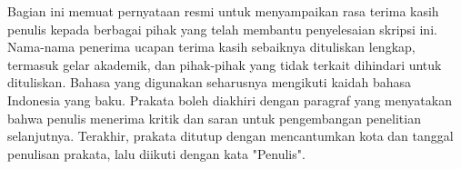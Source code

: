 \newpage
{}
\vspace{10mm}
\normalsize
\justifying

Bagian ini memuat pernyataan resmi untuk menyampaikan rasa terima kasih penulis kepada berbagai pihak yang telah membantu penyelesaian skripsi ini. 
Nama-nama penerima ucapan terima kasih sebaiknya dituliskan lengkap, termasuk gelar akademik, dan pihak-pihak yang tidak terkait dihindari untuk dituliskan. 
Bahasa yang digunakan seharusnya mengikuti kaidah bahasa Indonesia yang baku. 
Prakata boleh diakhiri dengan paragraf yang menyatakan bahwa penulis menerima kritik dan saran untuk pengembangan penelitian selanjutnya. 
Terakhir, prakata ditutup dengan mencantumkan kota dan tanggal penulisan prakata, lalu diikuti dengan kata "Penulis".

